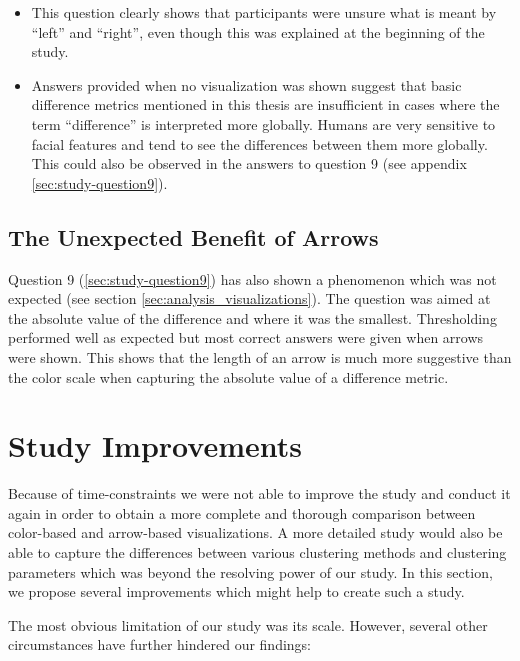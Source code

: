 \begin{itemize}
	\item This question clearly shows that participants were unsure what is meant by ``left'' and ``right'', even though this was explained at the beginning of the study.  
	\item Answers provided when no visualization was shown suggest that basic difference metrics mentioned in this thesis are insufficient in cases where the term ``difference'' is interpreted more globally. Humans are very sensitive to facial features and tend to see the differences between them more globally. This could also be observed in the answers to question 9 (see appendix \ref{sec:study-question9}).
\end{itemize}

\subsection{The Unexpected Benefit of Arrows}

Question 9 (\ref{sec:study-question9}) has also shown a phenomenon which was not expected (see section \ref{sec:analysis_visualizations}). The question was aimed at the absolute value of the difference and where it was the smallest. Thresholding performed well as expected but most correct answers were given when arrows were shown. This shows that the length of an arrow is much more suggestive than the color scale when capturing the absolute value of a difference metric.

\section{Study Improvements}

Because of time-constraints we were not able to improve the study and conduct it again in order to obtain a more complete and thorough comparison between color-based and arrow-based visualizations. A more detailed study would also be able to capture the differences between various clustering methods and clustering parameters which was beyond the resolving power of our study. In this section, we propose several improvements which might help to create such a study.

The most obvious limitation of our study was its scale. However, several other circumstances have further hindered our findings:

